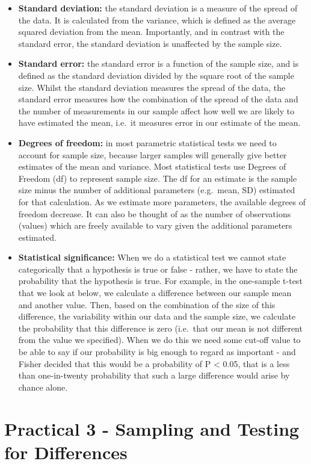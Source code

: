\documentclass[
]{book}
\begin{document}
\begin{itemize}
\item
  \textbf{Standard deviation:} the standard deviation is a measure of the spread of the data. It is calculated from the variance, which is defined as the average squared deviation from the mean. Importantly, and in contrast with the standard error, the standard deviation is unaffected by the sample size.
\item
  \textbf{Standard error:} the standard error is a function of the sample size, and is defined as the standard deviation divided by the square root of the sample size. Whilst the standard deviation measures the spread of the data, the standard error measures how the combination of the spread of the data and the number of measurements in our sample affect how well we are likely to have estimated the mean, i.e.~it measures error in our estimate of the mean.
\item
  \textbf{Degrees of freedom:} in most parametric statistical tests we need to account for sample size, because larger samples will generally give better estimates of the mean and variance. Most statistical tests use Degrees of Freedom (df) to represent sample size. The df for an estimate is the sample size minus the number of additional parameters (e.g.~mean, SD) estimated for that calculation. As we estimate more parameters, the available degrees of freedom decrease. It can also be thought of as the number of observations (values) which are freely available to vary given the additional parameters estimated.
\item
  \textbf{Statistical significance:} When we do a statistical test we cannot state categorically that a hypothesis is true or false - rather, we have to state the probability that the hypothesis is true. For example, in the one-sample t-test that we look at below, we calculate a difference between our sample mean and another value. Then, based on the combination of the size of this difference, the variability within our data and the sample size, we calculate the probability that this difference is zero (i.e.~that our mean is not different from the value we specified). When we do this we need some cut-off value to be able to say if our probability is big enough to regard as important - and Fisher decided that this would be a probability of P \textless{} 0.05, that is a less than one-in-twenty probability that such a large difference would arise by chance alone.
\end{itemize}

\section{Practical 3 - Sampling and Testing for Differences}\label{practical-3---sampling-and-testing-for-differences}
\end{document}
